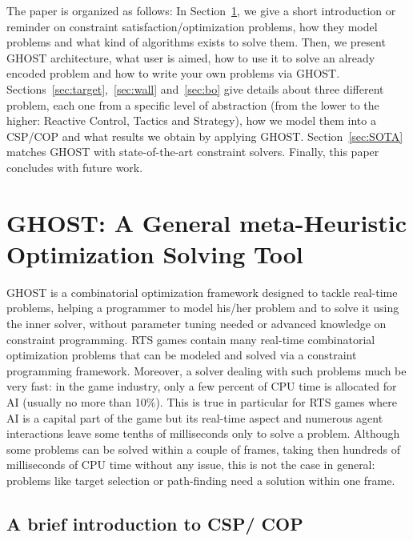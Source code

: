 \documentclass[journal]{IEEEtran}
\newcommand{\csp}{\textsc{CSP}\xspace}
\newcommand{\cop}{\textsc{COP}\xspace}
\newcommand{\ghost}{\textsc{GHOST}\xspace}
\begin{document}
The paper is organized as follows: In Section~\ref{sec:ghost}, we give
a     short     introduction     or     reminder     on     constraint
satisfaction/optimization problems,  how they model problems  and what
kind  of algorithms  exists to  solve them.   Then, we  present \ghost
architecture, what  user is aimed, how  to use it to  solve an already
encoded  problem  and how  to  write  your  own problems  via  \ghost.
Sections~\ref{sec:target},~\ref{sec:wall}     and~\ref{sec:bo}    give
details about three  different problem, each one from a  specific level of
abstraction (from  the lower to  the higher: Reactive  Control, Tactics
and Strategy), how  we model them into a \csp/\cop  and what results
we obtain by applying  \ghost. Section~\ref{sec:SOTA} matches \ghost
with  state-of-the-art   constraint  solvers.   Finally,   this  paper
concludes with future work.

\section{\ghost:   A  General   meta-Heuristic  Optimization   Solving
  Tool}\label{sec:ghost}

\ghost is a combinatorial  optimization framework designed to tackle real-time problems, helping a programmer to model his/her problem and to solve it using the inner solver, without parameter tuning needed or advanced knowledge on constraint programming. RTS games contain many real-time combinatorial optimization problems that can be modeled and solved via a constraint programming framework. Moreover, a solver dealing with such problems much be very fast: in the game industry, only a few percent of CPU time is allocated for AI (usually no more than 10\%). This is true in particular for RTS games where AI is a capital part of the game but its real-time aspect and numerous agent interactions  leave some tenths of milliseconds only to solve a problem. Although some problems can be solved within a couple of frames, taking then hundreds of milliseconds of CPU time without any issue, this is not the case in general: problems like target selection or path-finding need a solution within one frame.  


\subsection{A brief introduction to \csp / \cop}
\end{document}
